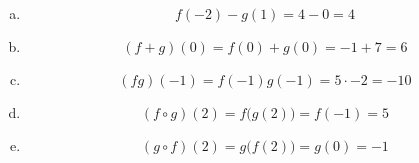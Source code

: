 \documentclass[11pt,letterpaper]{article}
\begin{document}
\sol 
\begin{enumerate}[(a)]
\item 
	\[
	f(-2) - g(1)= 4 - 0= 4
	\] \pspace

\item 
	\[
	(f + g)(0)= f(0) + g(0)= -1 + 7= 6
	\] \pspace
 
\item 
	\[
	(fg)(-1)= f(-1) g(-1)= 5 \cdot -2= -10
	\] \pspace
 
\item 
	\[
	(f \circ g)(2)= f \big( g(2) \big)= f(-1)= 5 
	\] \pspace
 
\item 
	\[
	(g \circ f)(2)= g \big( f(2) \big)= g(0)= -1
	\] 
\end{enumerate}
\end{document}

